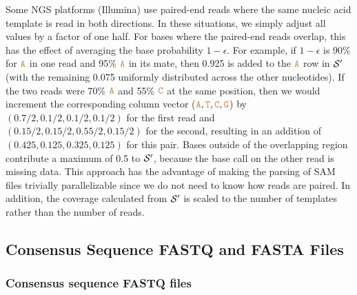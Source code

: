 \documentclass[12pt]{article}
\begin{document}
Some NGS platforms (\eg Illumina) use paired-end reads where the same nucleic acid template is read in both directions.
In these situations, we simply adjust all values by a factor of one half.
For bases where the paired-end reads overlap, this has the effect of averaging the base probability $1-\epsilon$.
For example, if $1-\epsilon$ is 90\% for $\texttt{\textcolor{brown}{A}}$ in one read and 95\% $\texttt{\textcolor{brown}{A}}$ in its mate, then 0.925 is added to the $\texttt{\textcolor{brown}{A}}$ row in $\mathcal{S}'$ (with the remaining 0.075 uniformly distributed across the other nucleotides).
If the two reads were 70\% $\texttt{\textcolor{brown}{A}}$ and 55\% $\texttt{\textcolor{brown}{C}}$ at the same position, then we would increment the corresponding column vector ($\texttt{\textcolor{brown}{A}}, \texttt{\textcolor{brown}{T}}, \texttt{\textcolor{brown}{C}}, \texttt{\textcolor{brown}{G}}$) by $(0.7/2, 0.1/2, 0.1/2, 0.1/2)$ for the first read and $(0.15/2, 0.15/2, 0.55/2, 0.15/2)$ for the second, resulting in an addition of $(0.425, 0.125, 0.325, 0.125)$ for this pair.
Bases outside of the overlapping region contribute a maximum of 0.5 to $\mathcal{S}'$, because the base call on the other read is missing data.
This approach has the advantage of making the parsing of SAM files trivially parallelizable since we do not need to know how reads are paired.
In addition, the coverage calculated from $\mathcal{S}'$ is scaled to the number of templates rather than the number of reads.



\subsection{Consensus Sequence FASTQ and FASTA Files}
\label{fastq_construction}

\subsubsection{Consensus sequence FASTQ files}
\end{document}
